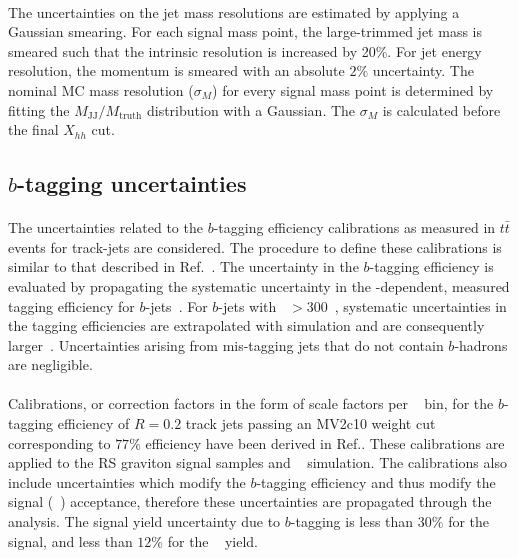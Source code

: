 \paragraph{}
The uncertainties on the jet mass resolutions are estimated by applying a Gaussian smearing.
For each signal mass point, the large-\R trimmed jet mass is smeared such that the intrinsic resolution is increased by 20\%. 
For jet energy resolution, the momentum is smeared with an absolute $2\%$ uncertainty. 
The nominal MC mass resolution ($\sigma_{M}$) for every signal mass point is determined by fitting the $M_\text{JJ} / M_\text{truth}$ distribution with a Gaussian. 
The $\sigma_{M}$ is calculated before the final $X_{hh}$ cut.


\subsection{$b$-tagging uncertainties}
\label{sec:b-tagging-unc}
\paragraph{}
The uncertainties related to the $b$-tagging efficiency calibrations as measured in $t\bar{t}$ events for track-jets are considered. 
The procedure to define these calibrations is similar to that described in Ref.~\cite{Aad:2015ydr}. 
The uncertainty in the $b$-tagging efficiency is evaluated by propagating the systematic uncertainty in the \pt-dependent, measured tagging efficiency for $b$-jets~\cite{ATLAS-CONF-2014-004}. 
For $b$-jets with \pt~$> 300$~\GeV, systematic uncertainties in the tagging efficiencies are extrapolated with simulation and are consequently larger~\cite{Aad:2015ydr}. 
Uncertainties arising from mis-tagging jets that do not contain $b$-hadrons are negligible.

\paragraph{}
Calibrations, or correction factors in the form of scale factors per \pt~ bin, for the $b$-tagging efficiency of $R=0.2$ track jets passing an MV2c10 weight cut corresponding to $77\%$ efficiency have been derived in Ref.\cite{ATL-COM-PHYS-2015-009, ATL-COM-PHYS-2015-1323}.  
These calibrations are applied to the RS graviton signal samples and \ttbar~ simulation.  
The calibrations also include uncertainties which modify the $b$-tagging efficiency and thus modify the signal (\ttbar~) acceptance, therefore these uncertainties are propagated through the analysis.
The signal yield uncertainty due to $b$-tagging is less than $30\%$ for the signal, and less than $12\%$ for the \ttbar~ yield.


